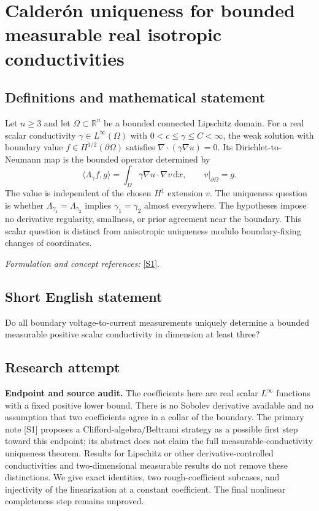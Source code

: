 \documentclass[11pt]{article}
\begin{document}
\section*{\texorpdfstring{Calderón uniqueness for bounded measurable real isotropic conductivities}{Calderón uniqueness for bounded measurable real isotropic conductivities}}\label{314}
\subsection{Definitions and mathematical statement}
Let $n\ge3$ and let $\Omega\subset{\mathbb{R}}^n$ be a bounded connected Lipschitz domain. For a real scalar conductivity $\gamma\in L^\infty(\Omega)$ with $0<c\le\gamma\le C<\infty$, the weak solution with boundary value $f\in H^{1/2}(\partial\Omega)$ satisfies $\nabla\cdot(\gamma\nabla u)=0$. Its Dirichlet-to-Neumann map is the bounded operator determined by
\[
 \langle\Lambda_\gamma f,g\rangle
 =\int_\Omega\gamma\nabla u\cdot\nabla v{\,\mathrm{d}} x,
 \qquad v|_{\partial\Omega}=g.
\]
The value is independent of the chosen $H^1$ extension $v$. The uniqueness question is whether $\Lambda_{\gamma_1}=\Lambda_{\gamma_2}$ implies $\gamma_1=\gamma_2$ almost everywhere. The hypotheses impose no derivative regularity, smallness, or prior agreement near the boundary. This scalar question is distinct from anisotropic uniqueness modulo boundary-fixing changes of coordinates.
\par\smallskip\textit{Formulation and concept references:} \href{https://arxiv.org/pdf/1803.06931v2}{[S1]}.

\subsection{Short English statement}
Do all boundary voltage-to-current measurements uniquely determine a bounded measurable positive scalar conductivity in dimension at least three?
\subsection{Research attempt}
\textbf{Endpoint and source audit.}
The coefficients here are real scalar $L^\infty$ functions with a fixed
positive lower bound.  There is no Sobolev derivative available and no
assumption that two coefficients agree in a collar of the boundary.
The primary note [S1] proposes a Clifford-algebra/Beltrami strategy as a
possible first step toward this endpoint; its abstract does not claim the
full measurable-conductivity uniqueness theorem.  Results for Lipschitz or
other derivative-controlled conductivities and two-dimensional measurable
results do not remove these distinctions.  We give exact identities, two
rough-coefficient subcases, and injectivity of the linearization at a constant
coefficient.  The final nonlinear completeness step remains unproved.
\end{document}
